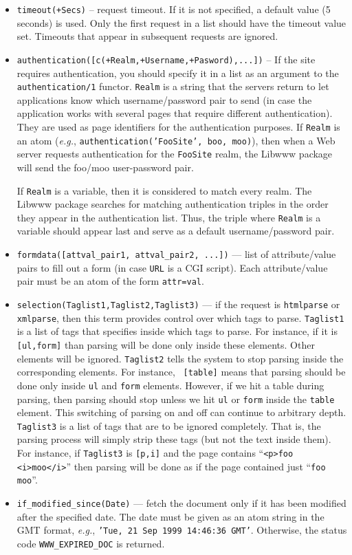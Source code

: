 \begin{itemize}
  \item {\tt timeout(+Secs)} -- request timeout. If it is not specified, a
    default value (5 seconds) is used. Only the first request in a list
    should have the timeout value set. Timeouts that appear in subsequent
    requests are ignored.
  \item {\tt authentication([c(+Realm,+Username,+Pasword),...])} -- If the
    site requires authentication, you should specify it in a list as an
    argument to the {\tt authentication/1} functor. {\tt Realm} is a string
    that the servers return to let applications know which
    username/password pair to send (in case the application works with
    several pages that require different authentication). They are used as
    page identifiers for the authentication purposes. If {\tt Realm} is an
    atom ({\it e.g.}, {\tt authentication('FooSite', boo, moo)}), then when
    a Web server requests authentication for the {\tt FooSite} realm, the
    Libwww package will send the foo/moo user-password pair.

    If {\tt Realm} is a variable, then it is considered to match every
    realm. The Libwww package searches for matching authentication triples
    in the order they appear in the authentication list. Thus, the triple
    where {\tt Realm} is a variable should appear last and serve as a
    default username/password pair.
  \item {\tt formdata([attval\_pair1, attval\_pair2, ...])} --- list of
    attribute/value pairs to fill out a form (in case {\tt URL} is a CGI
    script). Each attribute/value pair must be an atom of the form
    {\tt attr=val}.
  \item {\tt selection(Taglist1,Taglist2,Taglist3)} --- if the request is
    {\tt htmlparse} or {\tt xmlparse}, then this term provides control over
    which tags to parse. {\tt Taglist1} is a list of tags that specifies
    inside which tags to parse. For instance, if it is {\tt [ul,form]}
    than parsing will be done only inside these elements. Other
    elements will be ignored. {\tt Taglist2} tells the system to stop
    parsing inside the corresponding elements. For instance, {\tt
      [table]} means that parsing should be done only inside {\tt ul} and
    {\tt form} elements. However, if we hit a table during parsing,
    then parsing should stop unless we hit {\tt ul} or {\tt form} inside
    the {\tt table} element. This switching of parsing on and off can
    continue to arbitrary depth. {\tt Taglist3} is a list of tags that are
    to be ignored completely. That is, the parsing process will simply
    strip these tags (but not the text inside them). For instance, if
    {\tt Taglist3} is {\tt [p,i]} and the page contains ``{\tt <p>foo
    <i>moo</i>}'' then parsing will be done as if the page contained just
  ``{\tt foo moo}''.
\item {\tt if\_modified\_since(Date)} --- fetch the document only if it has
  been modified after the specified date. The date must be given as an atom
  string in the GMT format, {\it e.g.}, {\tt 'Tue, 21 Sep 1999 14:46:36 GMT'}.
  Otherwise, the status code {\tt WWW\_EXPIRED\_DOC} is returned.
\end{itemize}

